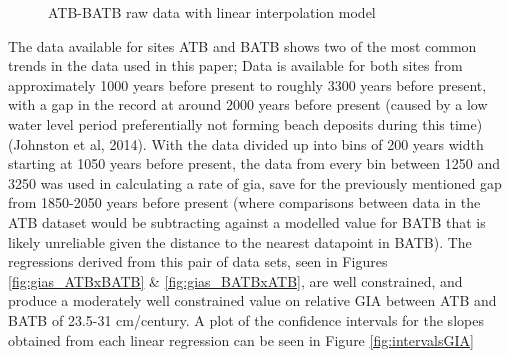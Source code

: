\begin{figure}[h]
	\caption{ATB-BATB raw data with linear interpolation model}
	\label{fig:data_ATBxBATB}
\end{figure}
The data available for sites ATB and BATB shows two of the most common trends in
 the data used in this paper; Data is available for both sites from
 approximately 1000 years before present to roughly 3300 years before present,
 with a gap in the record at around 2000 years before present (caused by a low
 water level period preferentially not forming beach deposits during this time)
 (Johnston et al, 2014). With the data divided up into bins of 200 years width
 starting at 1050 years before present, the data from every bin between 1250 and 3250 was used
 in calculating a rate of gia, save for the previously mentioned gap from 1850-2050
 years before present (where comparisons between data in the ATB dataset would be
 subtracting against a modelled value for BATB that is likely unreliable given
 the distance to the nearest datapoint in BATB). The regressions derived from this pair of data sets,
 seen in Figures \ref{fig:gias_ATBxBATB} \& \ref{fig:gias_BATBxATB}, are well
 constrained, and produce a moderately well constrained value on relative GIA
 between ATB and BATB of 23.5-31 cm/century. A plot of the confidence intervals
 for the slopes obtained from each linear regression can be seen in Figure \ref{fig:intervalsGIA}


\newpage

